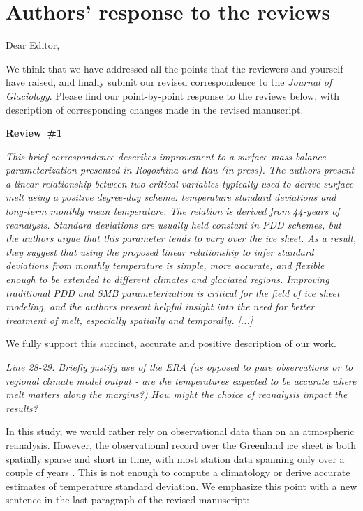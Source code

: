 \documentclass[10pt]{article}
\def\referee#1{\bigskip\textcolor{blue!50!black}{\textit{#1}}}
\begin{document}
\section*{Authors' response to the reviews}

Dear Editor,

We think that we have addressed all the points that the reviewers and yourself have raised, and finally submit our revised correspondence to the \emph{Journal of Glaciology}. Please find our point-by-point response to the reviews below, with description of corresponding changes made in the revised manuscript.


\bigskip
\textbf{Review~{\#}1}

\referee{This brief correspondence describes improvement to a surface mass balance parameterization presented in Rogozhina and Rau (in  press). The authors present a linear relationship between two critical variables typically used to derive surface melt using a positive degree-day scheme: temperature standard deviations and long-term monthly mean temperature. The relation is derived from 44-years of reanalysis. Standard deviations are usually held constant in PDD schemes, but the authors argue that this parameter tends to vary over the ice sheet. As a result, they suggest that using the proposed linear relationship to infer standard deviations from monthly temperature is simple, more accurate, and flexible enough to be extended to different climates and glaciated regions. Improving traditional PDD and SMB parameterization is critical for the field of ice sheet modeling, and the authors present helpful insight into the need for better treatment of melt, especially spatially and temporally. [...]}

We fully support this succinct, accurate and positive description of our work.



\referee{Line 28-29: Briefly justify use of the ERA (as opposed to pure observations or to regional climate model output - are the temperatures expected to be accurate where melt matters along the margins?) How might the choice of reanalysis impact the results?}

In this study, we would rather rely on observational data than on an atmospheric reanalysis. However, the observational record over the Greenland ice sheet is both spatially sparse and short in time, with most station data spanning only over a couple of years \citep[see e.g.~][]{fausto-etal-2011}. This is not enough to compute a climatology or derive accurate estimates of temperature standard deviation. We emphasize this point with a new sentence in the last paragraph of the revised manuscript:
\end{document}

